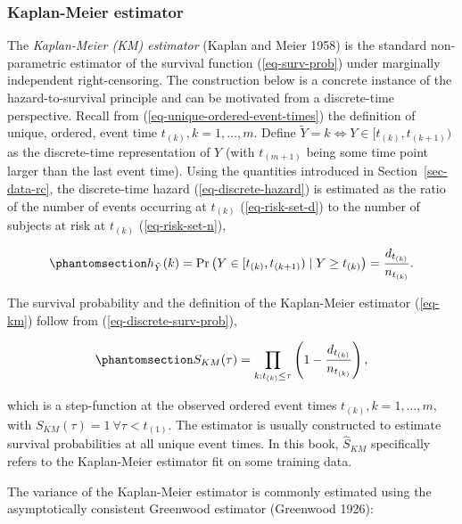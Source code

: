 \documentclass[
  letterpaper,
  krantz2]{style/krantz}
\begin{document}
\subsubsection{Kaplan-Meier estimator}\label{sec-surv-km}

The \emph{Kaplan-Meier (KM) estimator}
(Kaplan and Meier 1958) is the standard non-parametric estimator of the
survival function (\ref{eq-surv-prob}) under marginally independent
right-censoring. The construction below is a concrete instance of the
hazard-to-survival principle and can be motivated from a discrete-time
perspective. Recall from (\ref{eq-unique-ordered-event-times}) the
definition of unique, ordered, event time \(t_{(k)}, k=1,\ldots,m\).
Define \(\tilde{Y} = k \Leftrightarrow Y \in [t_{(k)},t_{(k+1)})\) as
the discrete-time representation of \(Y\) (with \(t_{(m+1)}\) being some
time point larger than the last event time). Using the quantities
introduced in Section~\ref{sec-data-rc}, the discrete-time
hazard (\ref{eq-discrete-hazard}) is estimated as
the ratio of the number of events occurring at \(t_{(k)}\)
(\ref{eq-risk-set-d}) to the number of subjects at risk at \(t_{(k)}\)
(\ref{eq-risk-set-n}),

\begin{equation}\phantomsection\label{eq-disc-haz-non-param}{
h_{\tilde{Y}}(k) = \Pr\left(Y\in [t_{(k)},t_{(k+1)}) \mid Y \geq t_{(k)}\right)=\frac{d_{t_{(k)}}}{n_{t_{(k)}}}.
}\end{equation}

The survival probability and the definition of
the Kaplan-Meier estimator (\ref{eq-km}) follow from
(\ref{eq-discrete-surv-prob}),

\begin{equation}\phantomsection\label{eq-km}{
S_{KM}(\tau) = \prod_{k:t_{(k)} \leq \tau}\left(1-\frac{d_{t_{(k)}}}{n_{t_{(k)}}}\right),
}\end{equation}

which is a step-function at the observed ordered event times
\(t_{(k)}, k=1,\ldots,m\), with
\(S_{KM}(\tau) = 1\ \forall \tau < t_{(1)}\). The estimator is usually
constructed to estimate survival probabilities at all unique event
times. In this book, \(\hat{S}_{KM}\) specifically refers to the
Kaplan-Meier estimator fit on some training data.

The variance of the Kaplan-Meier estimator is commonly estimated using
the asymptotically consistent Greenwood estimator (Greenwood
1926):
\end{document}
